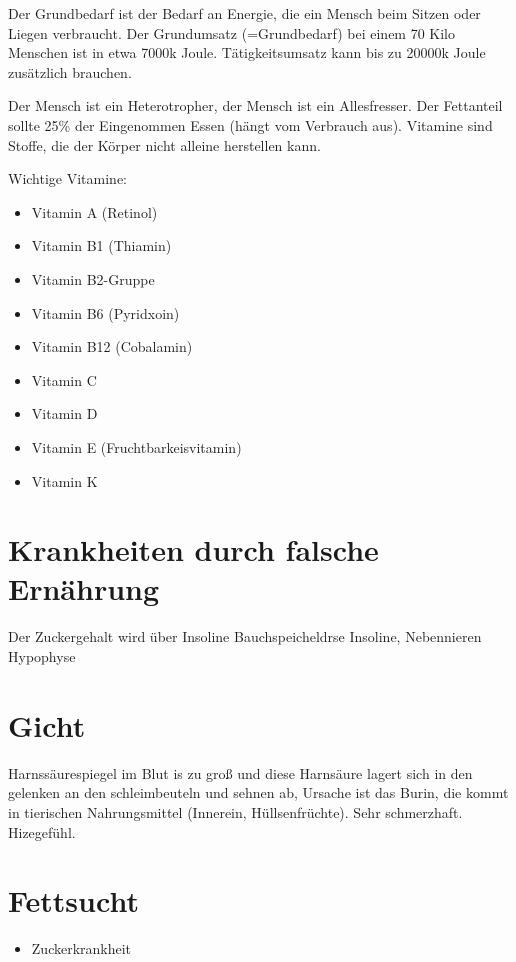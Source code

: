 \documentclass[a4paper]{article}
\begin{document}
Der Grundbedarf ist der Bedarf an Energie, die ein Mensch beim Sitzen oder Liegen verbraucht. Der Grundumsatz (=Grundbedarf) bei einem 70 Kilo Menschen ist in etwa 7000k Joule. Tätigkeitsumsatz kann bis zu 20000k Joule zusätzlich brauchen.

Der Mensch ist ein Heterotropher, der Mensch ist ein Allesfresser. Der Fettanteil sollte 25\% der Eingenommen Essen (hängt vom Verbrauch aus). Vitamine sind Stoffe, die der Körper nicht alleine herstellen kann.

Wichtige Vitamine:

\begin{itemize}
\item Vitamin A (Retinol)
\item Vitamin B1 (Thiamin)
\item Vitamin B2-Gruppe 
\item Vitamin B6 (Pyridxoin)
\item Vitamin B12 (Cobalamin)
\item Vitamin C
\item Vitamin D
\item Vitamin E (Fruchtbarkeisvitamin)
\item Vitamin K
\end{itemize}

\section{Krankheiten durch falsche Ernährung}

Der Zuckergehalt wird über Insoline
Bauchspeicheldrse Insoline, Nebennieren Hypophyse 

\section{Gicht}

Harnssäurespiegel im Blut is zu groß und diese Harnsäure lagert sich in den gelenken an den schleimbeuteln und sehnen ab, Ursache ist das Burin, die kommt in tierischen Nahrungsmittel (Innerein, Hüllsenfrüchte). Sehr schmerzhaft. Hizegefühl. 

\section{Fettsucht}

\begin{itemize}
\item Zuckerkrankheit 
\end{itemize}
\end{document}
